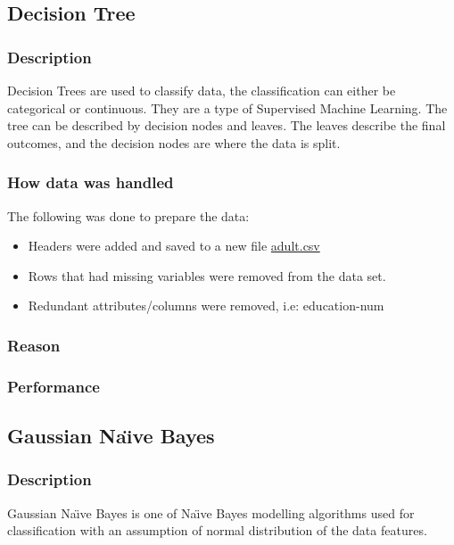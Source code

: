\documentclass[12pt]{article}
\begin{document}
	\subsection{Decision Tree}
	\subsubsection{Description}
	
	Decision Trees are used to classify data, the classification can either be categorical or continuous. They are a type of Supervised Machine Learning. The tree can be described by decision nodes and leaves. The leaves describe the final outcomes, and the decision nodes are where the data is split\cite{decision-tree-explanation}.
	
	\subsubsection{How data was handled}
	
	The following was done to prepare the data:
	\begin{itemize}
		\item Headers were added and saved to a new file \href{run:../data/adult.csv}{adult.csv}
		\item Rows that had missing variables were removed from the data set.
		\item Redundant attributes/columns were removed, i.e: education-num
	\end{itemize}

	\subsubsection{Reason}
	\subsubsection{Performance}
	\newpage
	
	\subsection{Gaussian Na\"{\i}ve Bayes}
	\subsubsection{Description}
	Gaussian Na\"{\i}ve Bayes is one of Na\"{\i}ve Bayes modelling algorithms used for classification with an assumption of normal distribution of the data features.
\end{document}
